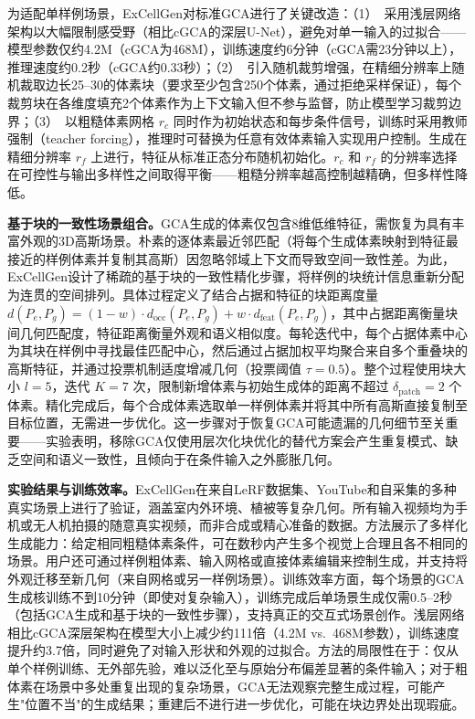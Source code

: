 为适配单样例场景，ExCellGen对标准GCA进行了关键改造：（1）~采用浅层网络架构以大幅限制感受野（相比cGCA的深层U-Net），避免对单一输入的过拟合——模型参数仅约4.2M（cGCA为468M），训练速度约6分钟（cGCA需23分钟以上），推理速度约0.2秒（cGCA约0.33秒）；（2）~引入随机裁剪增强，在精细分辨率上随机裁取边长25--30的体素块（要求至少包含250个体素，通过拒绝采样保证），每个裁剪块在各维度填充2个体素作为上下文输入但不参与监督，防止模型学习裁剪边界；（3）~以粗糙体素网格 $r_c$ 同时作为初始状态和每步条件信号，训练时采用教师强制（teacher forcing），推理时可替换为任意有效体素输入实现用户控制。生成在精细分辨率 $r_f$ 上进行，特征从标准正态分布随机初始化。$r_c$ 和 $r_f$ 的分辨率选择在可控性与输出多样性之间取得平衡——粗糙分辨率越高控制越精确，但多样性降低。

\textbf{基于块的一致性场景组合。}GCA生成的体素仅包含8维低维特征，需恢复为具有丰富外观的3D高斯场景。朴素的逐体素最近邻匹配（将每个生成体素映射到特征最接近的样例体素并复制其高斯）因忽略邻域上下文而导致空间一致性差。为此，ExCellGen设计了稀疏的基于块的一致性精化步骤，将样例的块统计信息重新分配为连贯的空间排列。具体过程定义了结合占据和特征的块距离度量 $d(P_e, P_g) = (1-w) \cdot d_\text{occ}(P_e, P_g) + w \cdot d_\text{feat}(P_e, P_g)$，其中占据距离衡量块间几何匹配度，特征距离衡量外观和语义相似度。每轮迭代中，每个占据体素中心为其块在样例中寻找最佳匹配中心，然后通过占据加权平均聚合来自多个重叠块的高斯特征，并通过投票机制适度增减几何（投票阈值 $\tau = 0.5$）。整个过程使用块大小 $l = 5$，迭代 $K = 7$ 次，限制新增体素与初始生成体的距离不超过 $\delta_\text{patch} = 2$ 个体素。精化完成后，每个合成体素选取单一样例体素并将其中所有高斯直接复制至目标位置，无需进一步优化。这一步骤对于恢复GCA可能遗漏的几何细节至关重要——实验表明，移除GCA仅使用层次化块优化的替代方案会产生重复模式、缺乏空间和语义一致性，且倾向于在条件输入之外膨胀几何。

\textbf{实验结果与训练效率。}ExCellGen在来自LeRF数据集、YouTube和自采集的多种真实场景上进行了验证，涵盖室内外环境、植被等复杂几何。所有输入视频均为手机或无人机拍摄的随意真实视频，而非合成或精心准备的数据。方法展示了多样化生成能力：给定相同粗糙体素条件，可在数秒内产生多个视觉上合理且各不相同的场景。用户还可通过样例粗体素、输入网格或直接体素编辑来控制生成，并支持将外观迁移至新几何（来自网格或另一样例场景）。训练效率方面，每个场景的GCA生成核训练不到10分钟（即使对复杂输入），训练完成后单场景生成仅需0.5--2秒（包括GCA生成和基于块的一致性步骤），支持真正的交互式场景创作。浅层网络相比cGCA深层架构在模型大小上减少约111倍（4.2M vs.\ 468M参数），训练速度提升约3.7倍，同时避免了对输入形状和外观的过拟合。方法的局限性在于：仅从单个样例训练、无外部先验，难以泛化至与原始分布偏差显著的条件输入；对于粗体素在场景中多处重复出现的复杂场景，GCA无法观察完整生成过程，可能产生"位置不当"的生成结果；重建后不进行进一步优化，可能在块边界处出现瑕疵。

